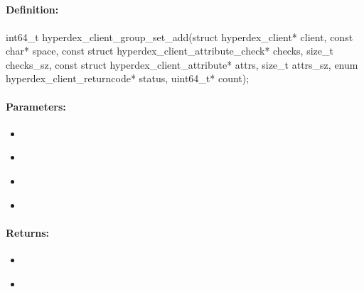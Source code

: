 \pagebreak
\subsection{}
\label{api:c:group_set_add}


\paragraph{Definition:}
\begin{ccode}
int64_t hyperdex_client_group_set_add(struct hyperdex_client* client,
        const char* space,
        const struct hyperdex_client_attribute_check* checks, size_t checks_sz,
        const struct hyperdex_client_attribute* attrs, size_t attrs_sz,
        enum hyperdex_client_returncode* status,
        uint64_t* count);
\end{ccode}

\paragraph{Parameters:}
\begin{itemize}[noitemsep]
\item {}\\

\item {}\\

\item {}\\

\item {}\\

\end{itemize}

\paragraph{Returns:}
\begin{itemize}[noitemsep]
\item {}\\

\item {}\\

\end{itemize}

